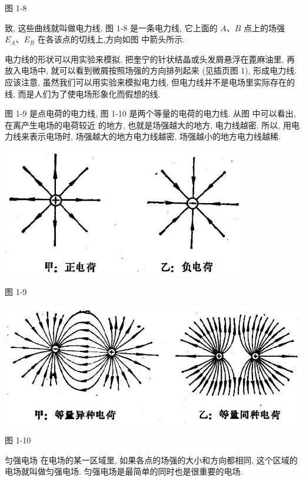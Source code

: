 \documentclass[10pt]{article}
\begin{document}
图 1-8

致, 这些曲线就叫做电力线. 图 1-8 是一条电力线, 它上面的 \(A\text{、}B\) 点上的场强 \({E}_{A}\text{、}{E}_{B}\) 在各该点的切线上,方向如图 中箭头所示.

电力线的形状可以用实验来模拟, 把奎宁的针状结晶或头发屑悬浮在蓖麻油里, 再放入电场中, 就可以看到微屑按照场强的方向排列起来 (见插页图 1), 形成电力线. 应该注意, 虽然我们可以用实验来模拟电力线, 但电力线并不是电场里实际存在的线, 而是人们为了使电场形象化而假想的线.

图 1-9 是点电荷的电力线, 图 1-10 是两个等量的电荷的电力线. 从图 中可以看出, 在离产生电场的电荷较近 的地方, 也就是场强越大的地方, 电力线越密. 所以, 用电力线来表示电场时, 场强越大的地方电力线越密, 场强越小的地方电力线越稀.

\begin{center}
\includegraphics[max width=0.8\textwidth]{images/01913056-1f15-74d8-9184-9aab52c9d66b_23_315782.jpg}
\end{center}

图 1-9

\begin{center}
\includegraphics[max width=1.0\textwidth]{images/01913056-1f15-74d8-9184-9aab52c9d66b_23_298368.jpg}
\end{center}

图 1-10

匀强电场 在电场的某一区域里, 如果各点的场强的大小和方向都相同, 这个区域的电场就叫做匀强电场. 匀强电场是最简单的同时也是很重要的电场.
\end{document}
